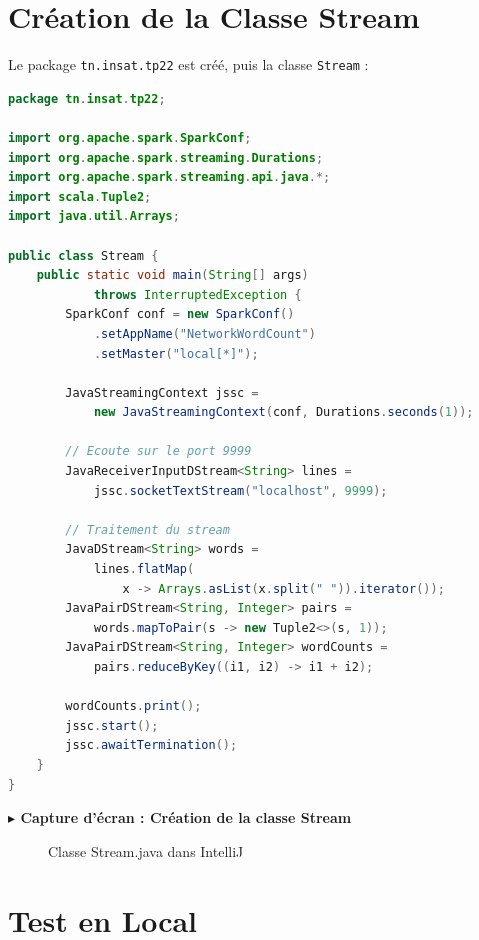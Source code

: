\documentclass[12pt,a4paper]{report}
\newcommand{\etape}[1]{\vspace{6pt}\textbf{\color{bleuESP}$\blacktriangleright$ #1}\vspace{4pt}}
\begin{document}
\section{Création de la Classe Stream}

Le package \texttt{tn.insat.tp22} est créé, puis la classe \texttt{Stream} :

\begin{lstlisting}[language=Java, caption=Stream.java - Spark Streaming WordCount]
package tn.insat.tp22;

import org.apache.spark.SparkConf;
import org.apache.spark.streaming.Durations;
import org.apache.spark.streaming.api.java.*;
import scala.Tuple2;
import java.util.Arrays;

public class Stream {
    public static void main(String[] args)
            throws InterruptedException {
        SparkConf conf = new SparkConf()
            .setAppName("NetworkWordCount")
            .setMaster("local[*]");

        JavaStreamingContext jssc =
            new JavaStreamingContext(conf, Durations.seconds(1));

        // Ecoute sur le port 9999
        JavaReceiverInputDStream<String> lines =
            jssc.socketTextStream("localhost", 9999);

        // Traitement du stream
        JavaDStream<String> words =
            lines.flatMap(
                x -> Arrays.asList(x.split(" ")).iterator());
        JavaPairDStream<String, Integer> pairs =
            words.mapToPair(s -> new Tuple2<>(s, 1));
        JavaPairDStream<String, Integer> wordCounts =
            pairs.reduceByKey((i1, i2) -> i1 + i2);

        wordCounts.print();
        jssc.start();
        jssc.awaitTermination();
    }
}
\end{lstlisting}

\etape{Capture d'écran : Création de la classe Stream}
\begin{figure}[H]
  \centering
  \caption{Classe Stream.java dans IntelliJ}
\end{figure}

\section{Test en Local}
\end{document}
